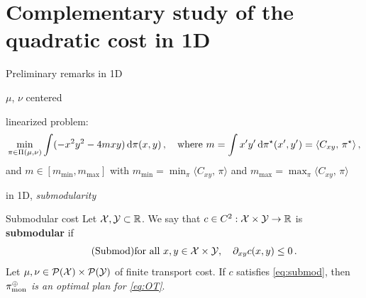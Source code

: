 \documentclass[9pt,xcolor={dvipsnames}]{beamer}
\begin{document}
\section{Complementary study of the quadratic cost in 1D}

\begin{frame}{Preliminary remarks in 1D}
    \begin{itemize}
        {\item $\mu$, $\nu$ centered}
        \item linearized problem:
        \begin{equation*}
            \min_{\pi\in\Pi(\mu,\nu)} \int (-x^2y^2-4mxy)\,\mathrm d\pi(x,y)\,,\quad\text{where }m=\int x'y'\,\mathrm d\pi^\star(x',y')=\langle C_{xy},\,\pi^\star\rangle\,,
        \end{equation*}
        {and $m\in[m_\text{min},m_\text{max}]$ with $m_{\text{min}}= \min_{\pi}\langle C_{xy},\,\pi\rangle$ and $m_{\text{max}}= \max_{\pi}\langle C_{xy},\,\pi\rangle$}
        \item in 1D, \emph{submodularity} 
    \end{itemize}
{\begin{block}{Submodular cost}
    \label{prop:submod}
    Let $\mathcal{X},\mathcal{Y}\subset\mathbb{R}$. We say that $c\in C^2:\mathcal{X}\times\mathcal{Y}\to\mathbb{R}$ is \textbf{submodular} if
    \begin{equation}
        \tag{Submod}
        \text{for all } x,y\in\mathcal{X}\times\mathcal{Y},\quad \partial_{xy}c(x,y)\leq0\,.
        \label{eq:submod}
    \end{equation}
    Let $\mu,\nu \in\mathcal{P}(\mathcal{X})\times\mathcal{P}(\mathcal{Y})$ of finite transport cost. If $c$ satisfies \cref{eq:submod}, then \emph{$\pi_\text{mon}^\oplus$ is an optimal plan for \cref{eq:OT}}.
\end{block}
}
\end{frame}
\end{document}
